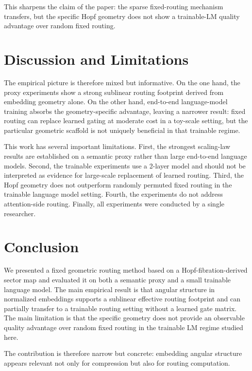 \documentclass[10pt,twocolumn]{article}
\begin{document}
This sharpens the claim of the paper: the sparse fixed-routing mechanism transfers, but the specific Hopf geometry does not show a trainable-LM quality advantage over random fixed routing.

\section{Discussion and Limitations}
The empirical picture is therefore mixed but informative. On the one hand, the proxy experiments show a strong sublinear routing footprint derived from embedding geometry alone. On the other hand, end-to-end language-model training absorbs the geometry-specific advantage, leaving a narrower result: fixed routing can replace learned gating at moderate cost in a toy-scale setting, but the particular geometric scaffold is not uniquely beneficial in that trainable regime.

This work has several important limitations. First, the strongest scaling-law results are established on a semantic proxy rather than large end-to-end language models. Second, the trainable experiments use a 2-layer model and should not be interpreted as evidence for large-scale replacement of learned routing. Third, the Hopf geometry does not outperform randomly permuted fixed routing in the trainable language model setting. Fourth, the experiments do not address attention-side routing. Finally, all experiments were conducted by a single researcher.

\section{Conclusion}
We presented a fixed geometric routing method based on a Hopf-fibration-derived sector map and evaluated it on both a semantic proxy and a small trainable language model. The main empirical result is that angular structure in normalized embeddings supports a sublinear effective routing footprint and can partially transfer to a trainable routing setting without a learned gate matrix. The main limitation is that the specific geometry does not provide an observable quality advantage over random fixed routing in the trainable LM regime studied here.

The contribution is therefore narrow but concrete: embedding angular structure appears relevant not only for compression but also for routing computation.



\end{document}
